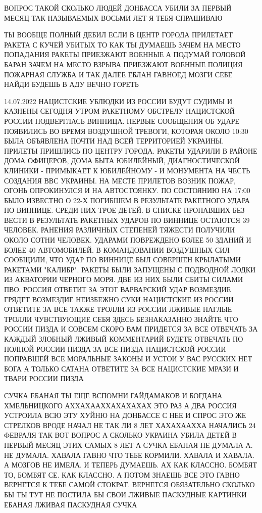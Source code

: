 ВОПРОС ТАКОЙ СКОЛЬКО ЛЮДЕЙ ДОНБАССА УБИЛИ ЗА ПЕРВЫЙ МЕСЯЦ ТАК НАЗЫВАЕМЫХ ВОСЬМИ
ЛЕТ Я ТЕБЯ СПРАШИВАЮ

ТЫ ВООБЩЕ ПОЛНЫЙ ДЕБИЛ ЕСЛИ В ЦЕНТР ГОРОДА ПРИЛЕТАЕТ РАКЕТА С КУЧЕЙ УБИТЫХ ТО
КАК ТЫ ДУМАЕШЬ ЗАЧЕМ НА МЕСТО ПОПАДАНИЯ РАКЕТЫ ПРИЕЗЖАЮТ ВОЕННЫЕ А ПОДУМАЙ
ГОЛОВОЙ БАРАН ЗАЧЕМ НА МЕСТО ВЗРЫВА ПРИЕЗЖАЮТ ВОЕННЫЕ ПОЛИЦИЯ ПОЖАРНАЯ СЛУЖБА И
ТАК ДАЛЕЕ ЕБЛАН ГАВНОЕД МОЗГИ СЕБЕ НАЙДИ БУДЕШЬ В АДУ ВЕЧНО ГОРЕТЬ

14.07.2022
НАЦИСТСКИЕ УБЛЮДКИ ИЗ РОССИИ БУДУТ СУДИМЫ И КАЗНЕНЫ СЕГОДНЯ УТРОМ РАКЕТНОМУ
ОБСТРЕЛУ НАЦИСТСКОЙ РОССИИ ПОДВЕРГЛАСЬ ВИННИЦА. ПЕРВЫЕ СООБЩЕНИЯ ОБ УДАРЕ
ПОЯВИЛИСЬ ВО ВРЕМЯ ВОЗДУШНОЙ ТРЕВОГИ, КОТОРАЯ ОКОЛО 10:30 БЫЛА ОБЪЯВЛЕНА ПОЧТИ
НАД ВСЕЙ ТЕРРИТОРИЕЙ УКРАИНЫ. ПРИЛЕТЫ ПРИШЛИСЬ ПО ЦЕНТРУ ГОРОДА. РАКЕТЫ УДАРИЛИ
В РАЙОНЕ ДОМА ОФИЦЕРОВ, ДОМА БЫТА ЮБИЛЕЙНЫЙ, ДИАГНОСТИЧЕСКОЙ КЛИНИКИ
- ПРИМЫКАЕТ К ЮБИЛЕЙНОМУ - И МОНУМЕНТА НА ЧЕСТЬ СОЗДАНИЯ ВВС УКРАИНЫ.  НА МЕСТЕ
ПРИЛЕТОВ ВОЗНИК ПОЖАР, ОГОНЬ ОПРОКИНУЛСЯ И НА АВТОСТОЯНКУ. ПО СОСТОЯНИЮ НА
17:00 БЫЛО ИЗВЕСТНО О 22-Х ПОГИБШЕМ В РЕЗУЛЬТАТЕ РАКЕТНОГО УДАРА ПО ВИННИЦЕ.
СРЕДИ НИХ ТРОЕ ДЕТЕЙ. В СПИСКЕ ПРОПАВШИХ БЕЗ ВЕСТИ В РЕЗУЛЬТАТЕ РАКЕТНЫХ УДАРОВ
ПО ВИННИЦЕ ОСТАЮТСЯ 39 ЧЕЛОВЕК. РАНЕНИЯ РАЗЛИЧНЫХ СТЕПЕНЕЙ ТЯЖЕСТИ ПОЛУЧИЛИ
ОКОЛО СОТНИ ЧЕЛОВЕК. УДАРАМИ ПОВРЕЖДЕНО БОЛЕЕ 50 ЗДАНИЙ И БОЛЕЕ 40 АВТОМОБИЛЕЙ.
В КОМАНДОВАНИИ ВОЗДУШНЫХ СИЛ СООБЩИЛИ, ЧТО УДАР ПО ВИННИЦЕ БЫЛ СОВЕРШЕН
КРЫЛАТЫМИ РАКЕТАМИ "КАЛИБР". РАКЕТЫ БЫЛИ ЗАПУЩЕНЫ С ПОДВОДНОЙ ЛОДКИ ИЗ
АКВАТОРИИ ЧЕРНОГО МОРЯ. ДВЕ ИЗ НИХ БЫЛИ СБИТЫ СИЛАМИ ПВО.  РОССИЯ ОТВЕТИТ ЗА
ЭТОТ ВАРВАРСКИЙ УДАР ВОЗМЕЗДИЕ ГРЯДЕТ ВОЗМЕЗДИЕ НЕИЗБЕЖНО СУКИ НАЦИСТСКИЕ ИЗ
РОССИИ ОТВЕТИТЕ ЗА ВСЕ ТАКЖЕ ТРОЛЛИ ИЗ РОССИИ ЛЖИВЫЕ НАГЛЫЕ ТРОЛЛИ ЧУВСТВУЮЩИЕ
СЕБЯ ЗДЕСЬ БЕЗНАКАЗАННО ЗНАЙТЕ ЧТО РОССИИ ПИЗДА И СОВСЕМ СКОРО ВАМ ПРИДЕТСЯ ЗА
ВСЕ ОТВЕЧАТЬ ЗА КАЖДЫЙ ЗЛОБНЫЙ ЛЖИВЫЙ КОММЕНТАРИЙ БУДЕТЕ ОТВЕЧАТЬ ПО ПОЛНОЙ
РОССИИ ПИЗДА ЗА ВСЕ ПИЗДА НАЦИСТСКОЙ РОССИИ ПОПРАВШЕЙ ВСЕ МОРАЛЬНЫЕ ЗАКОНЫ И
УСТОИ У ВАС РУССКИХ НЕТ БОГА А ТОЛЬКО САТАНА ОТВЕТИТЕ ЗА ВСЕ НАЦИСТСКИЕ МРАЗИ И
ТВАРИ РОССИИ ПИЗДА

СУЧКА ЕБАНАЯ ТЫ ЕЩЕ ВСПОМНИ ГАЙДАМАКОВ И БОГДАНА ХМЕЛЬНИЦКОГО АХХАХААХХАХАХАХАХ
ЭТО РАЗ А ДВА РОССИЯ УСТРОИЛА ВСЮ ЭТУ ХУЙНЮ НА ДОНБАССЕ С НЕЕ И СПРОС ЭТО ЖЕ
СТРЕЛКОВ ВРОДЕ НАЧАЛ НЕ ТАК ЛИ 8 ЛЕТ ХАХАХААХХА НАЧАЛИСЬ 24 ФЕВРАЛЯ ТАК ВОТ
ВОПРОС А СКОЛЬКО УКРАИНА УБИЛА ДЕТЕЙ В ПЕРВЫЙ МЕСЯЦ ЭТИХ САМЫХ 8 ЛЕТ А СУЧКА
ЕБАНАЯ НЕ ДУМАЛА А. НЕ ДУМАЛА. ХАВАЛА ГАВНО ЧТО ТЕБЕ КОРМИЛИ. ХАВАЛА И ХАВАЛА.
А МОЗГОВ НЕ ИМЕЛА. И ТЕПЕРЬ ДУМАЕШЬ. АХ КАК КЛАССНО. БОМБЯТ ТО, БОМБЯТ СЕ. КАК
КЛАССНО. А ПОТОМ ЗНАЕШЬ ВСЕ ЭТО ГАВНО ВЕРНЕТСЯ К ТЕБЕ САМОЙ СТОКРАТ. ВЕРНЕТСЯ
ОБЯЗАТЕЛЬНО СКОЛЬКО БЫ ТЫ ТУТ НЕ ПОСТИЛА БЫ СВОИ ЛЖИВЫЕ ПАСКУДНЫЕ КАРТИНКИ
ЕБАНАЯ ЛЖИВАЯ ПАСКУДНАЯ СУЧКА 


